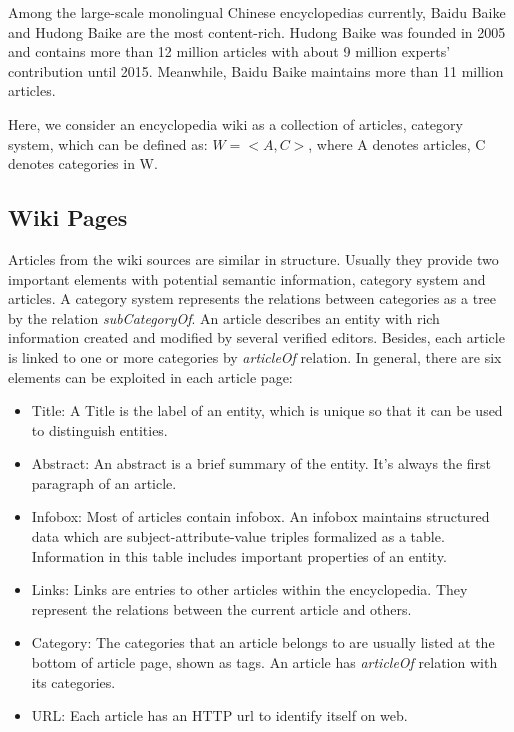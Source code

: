 \documentclass[runningheads,a4paper]{llncs}
\begin{document}
\begin{CJK*}{UTF8}{song}
Among the large-scale monolingual Chinese encyclopedias currently, Baidu Baike and Hudong Baike are the most content-rich. Hudong Baike was founded in 2005 and contains more than 12 million articles with about 9 million experts' contribution until 2015. Meanwhile, Baidu Baike maintains more than 11 million articles.

Here, we consider an encyclopedia wiki as a collection of articles, category system, which can be defined as: $W = <A,C>$, where A denotes articles, C denotes categories in W.

\subsection{Wiki Pages}
Articles from the wiki sources are similar in structure. Usually they provide two important elements with potential semantic information, category system and articles. A category system represents the relations between categories as a tree by the relation \textit{subCategoryOf}. An article describes an entity with rich information created and modified by several verified editors. Besides, each article is linked to one or more categories by \textit{articleOf} relation. In general, there are six elements can be exploited in each article page:
\begin{itemize}
  \item Title: A Title is the label of an entity, which is unique so that it can be used to distinguish entities.
  \item Abstract: An abstract is a brief summary of the entity. It's always the first paragraph of an article.
  \item Infobox: Most of articles contain infobox. An infobox maintains structured data which are subject-attribute-value triples formalized as a table. Information in this table includes important properties of an entity.
  \item Links: Links are entries to other articles within the encyclopedia. They represent the relations between the current article and others.
  \item Category: The categories that an article belongs to are usually listed at the bottom of article page, shown as tags. An article has \textit{articleOf} relation with its categories.
  \item URL: Each article has an HTTP url to identify itself on web.
\end{itemize}


\end{CJK*}
\end{document}
